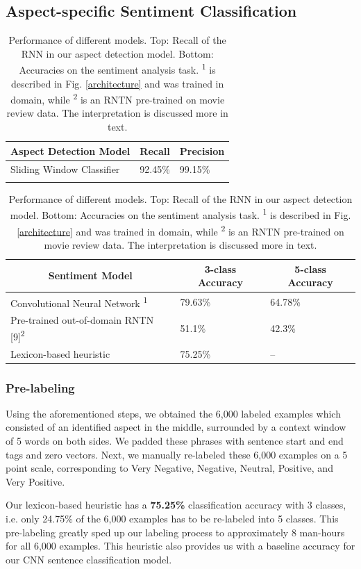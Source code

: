 \documentclass{article} %
\begin{document}
\subsection{Aspect-specific Sentiment Classification}

\begin{table}[t]
\begin{center}
\begin{tabular}{lll}
\multicolumn{1}{c}{\bf Aspect Detection Model}  &\multicolumn{1}{c}{\bf Recall}  &\multicolumn{1}{c}{\bf Precision} \\ \hline
Sliding Window Classifier & 92.45\%  & 99.15\%\\
&\\
\end{tabular}
\begin{tabular}{lll}
\multicolumn{1}{c}{\bf Sentiment Model}  &\multicolumn{1}{c}{\bf 3-class Accuracy} &\multicolumn{1}{c}{\bf 5-class Accuracy} \\ \hline
 Convolutional Neural Network \textsuperscript{1} & 79.63\% & 64.78\% \\
 Pre-trained out-of-domain RNTN [9]\textsuperscript{2}       & 51.1\% & 42.3\% \\
 Lexicon-based heuristic	& 75.25\% & -- \\
\end{tabular}
\end{center}
\caption{Performance of different models. Top: Recall of the RNN in our aspect detection model. Bottom: Accuracies on the sentiment analysis task. \textsuperscript{1} is described in Fig. \ref{architecture} and was trained in domain, while \textsuperscript{2} is an RNTN pre-trained on movie review data. The interpretation is discussed more in text.}
\label{ModelResultsTable}
\end{table}

\subsubsection{Pre-labeling}
Using the aforementioned steps, we obtained the 6,000 labeled examples which consisted of an identified aspect in the middle, surrounded by a context window of 5 words on both sides. We padded these phrases with sentence start and end tags and zero vectors. Next, we manually re-labeled these 6,000 examples on a 5 point scale, corresponding to Very Negative, Negative, Neutral, Positive, and Very Positive. 

Our lexicon-based heuristic has a \textbf{75.25\%} classification accuracy with 3 classes, i.e. only 24.75\% of the 6,000 examples has to be re-labeled into 5 classes. This pre-labeling greatly sped up our labeling process to approximately 8 man-hours for all 6,000 examples. This heuristic also provides us with a baseline accuracy for our CNN sentence classification model.
\end{document}
